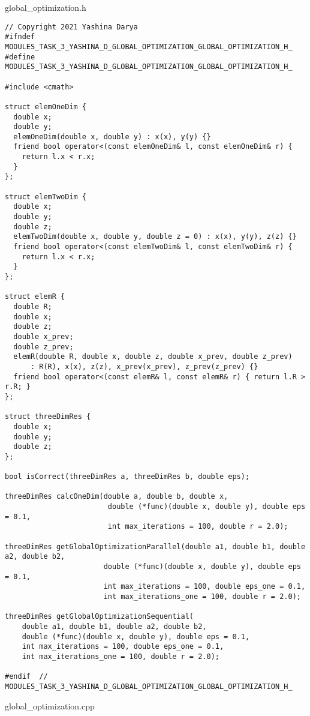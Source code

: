 \documentclass{report}
\begin{document}
global\_optimization.h
\begin{lstlisting}
// Copyright 2021 Yashina Darya
#ifndef MODULES_TASK_3_YASHINA_D_GLOBAL_OPTIMIZATION_GLOBAL_OPTIMIZATION_H_
#define MODULES_TASK_3_YASHINA_D_GLOBAL_OPTIMIZATION_GLOBAL_OPTIMIZATION_H_

#include <cmath>

struct elemOneDim {
  double x;
  double y;
  elemOneDim(double x, double y) : x(x), y(y) {}
  friend bool operator<(const elemOneDim& l, const elemOneDim& r) {
    return l.x < r.x;
  }
};

struct elemTwoDim {
  double x;
  double y;
  double z;
  elemTwoDim(double x, double y, double z = 0) : x(x), y(y), z(z) {}
  friend bool operator<(const elemTwoDim& l, const elemTwoDim& r) {
    return l.x < r.x;
  }
};

struct elemR {
  double R;
  double x;
  double z;
  double x_prev;
  double z_prev;
  elemR(double R, double x, double z, double x_prev, double z_prev)
      : R(R), x(x), z(z), x_prev(x_prev), z_prev(z_prev) {}
  friend bool operator<(const elemR& l, const elemR& r) { return l.R > r.R; }
};

struct threeDimRes {
  double x;
  double y;
  double z;
};

bool isCorrect(threeDimRes a, threeDimRes b, double eps);

threeDimRes calcOneDim(double a, double b, double x,
                        double (*func)(double x, double y), double eps = 0.1,
                        int max_iterations = 100, double r = 2.0);

threeDimRes getGlobalOptimizationParallel(double a1, double b1, double a2, double b2,
                       double (*func)(double x, double y), double eps = 0.1,
                       int max_iterations = 100, double eps_one = 0.1,
                       int max_iterations_one = 100, double r = 2.0);

threeDimRes getGlobalOptimizationSequential(
    double a1, double b1, double a2, double b2,
    double (*func)(double x, double y), double eps = 0.1,
    int max_iterations = 100, double eps_one = 0.1,
    int max_iterations_one = 100, double r = 2.0);

#endif  // MODULES_TASK_3_YASHINA_D_GLOBAL_OPTIMIZATION_GLOBAL_OPTIMIZATION_H_
\end{lstlisting}
global\_optimization.cpp
\end{document}
